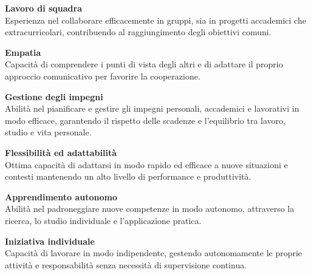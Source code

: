 \documentclass[10pt]{developercv} %
\begin{document}

\newpage


\textbf{Lavoro di squadra}\\
Esperienza nel collaborare efficacemente in gruppi, sia in progetti accademici che extracurricolari, contribuendo al raggiungimento degli obiettivi comuni.

\vspace{\baselineskip}

\textbf{Empatia}\\
Capacità di comprendere i punti di vista degli altri e di adattare il proprio approccio comunicativo per favorire la cooperazione.



\textbf{Gestione degli impegni}\\
Abilità nel pianificare e gestire gli impegni personali, accademici e lavorativi in modo efficace, garantendo il rispetto delle scadenze e l'equilibrio tra lavoro, studio e vita personale.

\vspace{\baselineskip}

\textbf{Flessibilità ed adattabilità}\\
Ottima capacità di adattarsi in modo rapido ed efficace a nuove situazioni e contesti mantenendo un alto livello di performance e produttività.

\vspace{\baselineskip}

\textbf{Apprendimento autonomo}\\
Abilità nel padroneggiare nuove competenze in modo autonomo, attraverso la ricerca, lo studio individuale e l'applicazione pratica.

\vspace{\baselineskip}

\textbf{Iniziativa individuale}\\
Capacità di lavorare in modo indipendente, gestendo autonomamente le proprie attività e responsabilità senza necessità di supervisione continua.
\end{document}
